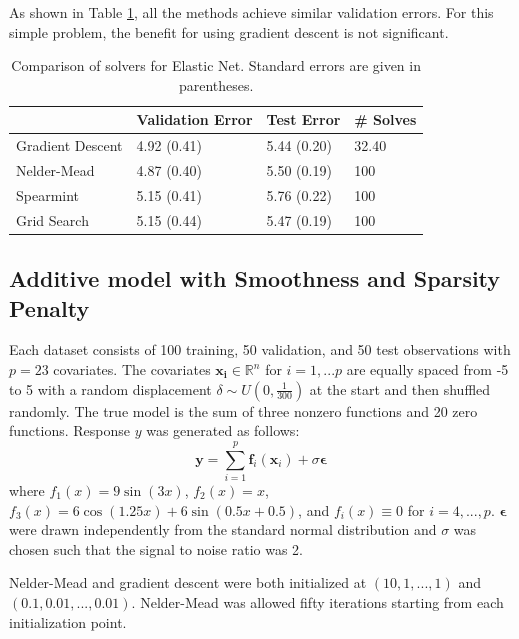 \documentclass[12pt]{article}
\begin{document}
As shown in Table \ref{tab:elasticnet}, all the methods achieve similar validation errors. For this simple problem, the benefit for using gradient descent is not significant.

\begin{table}
\caption {\label{tab:elasticnet} Comparison of solvers for Elastic Net. Standard errors are given in parentheses.}
\centering
\begin{tabular}{| l | l | l | l | }
\hline
& Validation Error  & Test Error & \# Solves\\
\hline
Gradient Descent & 4.92 (0.41) & 5.44 (0.20) & 32.40 \\
\hline
Nelder-Mead & 4.87 (0.40) & 5.50 (0.19) & 100 \\
\hline
Spearmint & 5.15 (0.41) & 5.76 (0.22) & 100 \\
\hline
Grid Search & 5.15 (0.44) & 5.47 (0.19) & 100 \\
\hline
\end{tabular}
\end{table}


\subsection{Additive model with Smoothness and Sparsity Penalty}
\label{sec:simulation_sparse_add}
Each dataset consists of 100 training, 50 validation, and 50 test observations with $p=23$ covariates. The covariates $\boldsymbol{x_i} \in \mathbb{R}^{n}$ for $i=1,...p$ are equally spaced from -5 to 5 with a random displacement $ \delta \sim U(0, \frac{1}{300}) $ at the start and then shuffled randomly. The true model is the sum of three nonzero functions and 20 zero functions. Response $y$ was generated as follows:
\begin{equation}
\boldsymbol y = \sum\limits_{i=1}^p \boldsymbol f_i(\boldsymbol x_i) + \sigma \boldsymbol \epsilon
\label{eq:simulation_sparse_add}
\end{equation}
where $f_1(x) = 9 \sin(3x)$,
$f_2(x) = x$, 
$f_3(x) = 6 \cos(1.25 x) + 6 \sin(0.5 x + 0.5)$, and $f_i(x) \equiv 0$ for $i = 4,...,p$. $\boldsymbol \epsilon$ were drawn independently from the standard normal distribution and $\sigma$ was chosen such that the signal to noise ratio was 2.

Nelder-Mead and gradient descent were both initialized at $(10, 1, ..., 1)$ and $(0.1, 0.01, ..., 0.01)$. Nelder-Mead was allowed fifty iterations starting from each initialization point.
\end{document}
